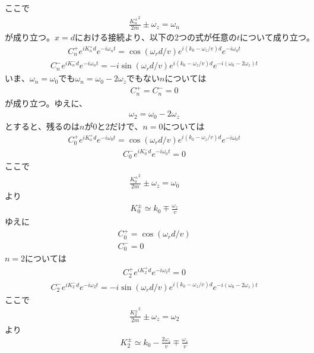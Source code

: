 ここで
\begin{align}
\frac{{K_{n}^{\pm}}^2}{2m}{\pm}\omega_{z}=\omega_{n}
\end{align}
$が成り立つ。x=dにおける接続より、以下の2つの式が任意のtについて成り立つ。$
\begin{align}
C_{n}^{+}e^{iK_{n}^{+}d}e^{-i\omega_{n}t}=\cos({{\omega_{r}}d/v})e^{i(k_{0}-\omega_{z}/v)d}e^{-i\omega_{0}t}
\end{align}
\begin{align}
C_{n}^{-}e^{iK_{n}^{-}d}e^{-i\omega_{n}t}=-i\sin({{\omega_{r}}d/v})e^{i(k_{0}-\omega_{z}/v)d}e^{-i(\omega_{0}-2\omega_{z})t}
\end{align}
$いま、\omega_{n}=\omega_{0}でも\omega_{n}=\omega_{0}-2\omega_{z}でもないnについては$
\begin{align}
C_{n}^{+}=C_{n}^{-}=0
\end{align}
が成り立つ。ゆえに、
\begin{align}
\omega_{2}=\omega_{0}-2\omega_{z}
\end{align}
$とすると、残るのはnが0と2だけで、n=0については$
\begin{align}
C_{0}^{+}e^{iK_{0}^{+}d}e^{-i\omega_{0}t}=\cos({{\omega_{r}}d/v})e^{i(k_{0}-\omega_{z}/v)d}e^{-i\omega_{0}t}
\end{align}
\begin{align}
C_{0}^{-}e^{iK_{0}^{-}d}e^{-i\omega_{0}t}=0
\end{align}
ここで
\begin{align}
\frac{{K_{0}^{\pm}}^2}{2m}{\pm}\omega_{z}=\omega_{0}
\end{align}
より
\begin{align}
K_{0}^{\pm}{\simeq}k_{0}{\mp}\frac{\omega_{z}}{v}
\end{align}
ゆえに
\begin{align}
C_{0}^{+}=\cos({{\omega_{r}}d/v}) \\
C_{0}^{-}=0
\end{align}
$n=2については$
\begin{align}
C_{2}^{+}e^{iK_{2}^{+}d}e^{-i\omega_{2}t}=0
\end{align}
\begin{align}
C_{2}^{-}e^{iK_{2}^{-}d}e^{-i\omega_{2}t}=-i\sin({{\omega_{r}}d/v})e^{i(k_{0}-\omega_{z}/v)d}e^{-i(\omega_{0}-2\omega_{z})t}
\end{align}
ここで
\begin{align}
\frac{{K_{2}^{\pm}}^2}{2m}{\pm}\omega_{z}=\omega_{2}
\end{align}
より
\begin{align}
K_{2}^{\pm}{\simeq}k_{0}-\frac{2\omega_{z}}{v}{\mp}\frac{\omega_{z}}{v}
\end{align}
